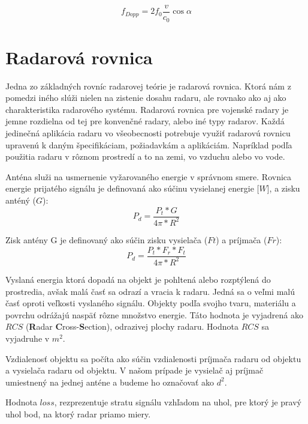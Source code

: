     \begin{equation} \label{eq:0}
      f_{Dopp} = 2 f_{0} \frac{v}{c_{0}}\cos \alpha
    \end{equation}
        

  \section{Radarová rovnica} \label{radarovarovnica}

    Jedna zo základných rovníc radarovej teórie je radarová rovnica. Ktorá nám z pomedzi iného slúži nielen na zistenie dosahu radaru, ale rovnako ako aj ako charakteristika radarového systému. Radarová rovnica pre vojenské radary je jemne rozdielna od tej pre konvenčné radary, alebo iné typy radarov. Každá jedinečná aplikácia radaru vo všeobecnosti potrebuje využiť radarovú rovnicu upravenú k daným špecifikáciam, požiadavkám a aplikáciám. Napríklad podľa použitia radaru v rôznom prostredí a to na zemi, vo vzduchu alebo vo vode.

    Anténa služi na usmernenie vyžarovaného energie v správnom smere. Rovnica energie prijatého signálu je definovaná ako súčinu vysielanej energie [$W$], a zisku anténý ($G$):
    \begin{equation} %
      P_{d} = \frac{P_{t} * G}{4\pi * R^{2}}
    \end{equation}

    Zisk antény G je definovaný ako súčin zisku vysielača ($Ft$) a príjmača ($Fr$):
    \begin{equation} %
      P_{d} = \frac{P_{t} * F_{r} * F_{t}}{4\pi * R^{2}}
    \end{equation}

    \hspace{0.6cm}Vyslaná energia ktorá dopadá na objekt je pohltená alebo rozptýlená do prostredia, avšak malá časť sa odrazí a vracia k radaru. Jedná sa o veľmi malú časť oproti veľkosti vyslaného signálu. Objekty podľa svojho tvaru, materiálu a povrchu odrážajú naspäť rôzne množstvo energie. Táto hodnota je vyjadrená ako $RCS$ (\textbf{R}adar \textbf{C}ross-\textbf{S}ection), odrazivej plochy radaru. Hodnota $RCS$ sa vyjadruhe v $m^{2}$.
    
    Vzdialenosť objektu sa počíta ako súčin vzdialenosti príjmača radaru od objektu a vysielača radaru od objektu. V našom prípade je vysielač aj príjmač umiestnený na jednej anténe a budeme ho označovať ako $d^{2}$.
    
    Hodnota $loss$, rezprezentuje stratu signálu vzhľadom na uhol, pre ktorý je pravý uhol bod, na ktorý radar priamo miery.

